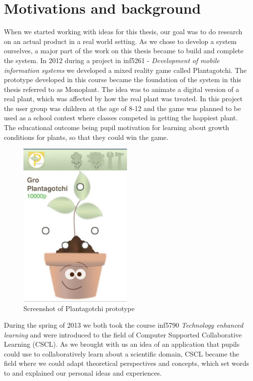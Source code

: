 \section{Motivations and background}
When we started working with ideas for this thesis, our goal was to do research on an actual product in a real world setting. As we chose to develop a system ourselves, a major part of the work on this thesis became to build and complete the system. In 2012 during a project in inf5261 - \emph{Development of mobile information systems} we developed a mixed reality game called Plantagotchi. The prototype developed in this course became the foundation of the system in this thesis referred to as Monoplant. The idea was to animate a digital version of a real plant, which was affected by how the real plant was treated. In this project the user group was children at the age of 8-12 and the game was planned to be used as a school contest where classes competed in getting the happiest plant. The educational outcome being pupil motivation for learning about growth conditions for plants, so that they could win the game. 

\begin{figure}
\centering
\includegraphics[width=0.5\textwidth]{img/introduction/plantagotchi.jpg}
\caption{Screenshot of Plantagotchi prototype}
\label{fig:scrshotplantagotchi}
\end{figure}

During the spring of 2013 we both took the course inf5790 \emph{Technology enhanced learning} and were introduced to the field of Computer Supported Collaborative Learning (CSCL). As we brought with us an idea of an application that pupils could use to collaboratively learn about a scientific domain, CSCL became the field where we could adapt theoretical perspectives and concepts, which set words to and explained our personal ideas and experiences. 

